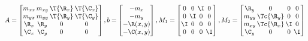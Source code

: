 \begin{algorithm}[ht]
    \begin{equation} %
        \setlength\arraycolsep{1pt}
        A =
        \begin{bmatrix}
            m_{xx} & m_{xy} & \T{\R_x} & \T{\C_x} \\
            m_{yx} & m_{yy} & \T{\R_y} & \T{\C_y} \\
            \R_x & \R_y & 0 & 0 \\
            \C_x & \C_y & 0 & 0 \\
        \end{bmatrix}
        ,
        b =
        \begin{bmatrix}
            -m_x \\ 
            -m_y \\ 
            -\R(x,y) \\ 
            -\C(x,y) \\
        \end{bmatrix}
        ,
        M_1 =
        \begin{bmatrix}
            0 & 0 & \I & 0 \\
            0 & \I & 0 & 0 \\
            \I & 0 & 0 & 0 \\
            0 & 0 & 0 & \I \\
        \end{bmatrix}
        ,
        M_2 =
        \begin{bmatrix}
            \R_y & 0 & 0 & 0 \\
            m_{yy} & \Tc{\R_y} & 0 & 0 \\
            m_{xy} & \Tc{\R_x} & \I & 0 \\
            \C_y & 0 & 0 & \I \\
        \end{bmatrix}
    \end{equation}
    

\end{algorithm}
